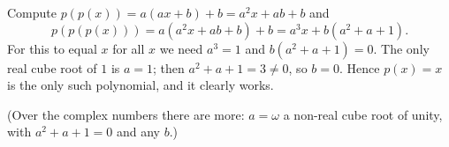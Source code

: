 Compute $p(p(x))=a(ax+b)+b=a^2x+ab+b$ and
\[
p(p(p(x)))=a(a^2x+ab+b)+b=a^3x+b(a^2+a+1).
\]
For this to equal $x$ for all $x$ we need $a^3=1$ and $b(a^2+a+1)=0$. The only real cube root of $1$ is $a=1$; then $a^2+a+1=3\ne0$, so $b=0$. Hence $p(x)=\boxed{x}$ is the only such polynomial, and it clearly works.

(Over the complex numbers there are more: $a=\omega$ a non-real cube root of unity, with $a^2+a+1=0$ and any $b$.)

